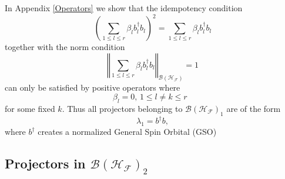 \documentclass[aps,preprint,amsfonts,amssymb,showpacs,showkeys]{revtex4}%
\begin{document}
In Appendix \ref{Operators} we show that the idempotency condition
\begin{equation}
\left(  \sum_{1\leq l\leq r}\beta_{l}b_{l}^{\dagger}b_{l}\right)  ^{2}%
=\sum_{1\leq l\leq r}\beta_{l}b_{l}^{\dagger}b_{l}%
\end{equation}
together with the norm condition
\begin{equation}
\left\Vert \sum_{1\leq l\leq r}\beta_{l}b_{l}^{\dagger}b_{l}\right\Vert
_{\mathcal{B}\left(  \mathcal{H}_{\mathcal{F}}\right)  }=1
\end{equation}
can only be satisfied by positive operators where
\begin{equation}
\beta_{l}=0,\,1\leq l\neq k\leq r\text{ }%
\end{equation}
for some fixed $k.$ Thus all projectors belonging to $\mathcal{B}\left(
\mathcal{H}_{\mathcal{F}}\right)  _{1}$ are of the form
\begin{equation}
\lambda_{1}=b^{\dagger}b,
\end{equation}
where $b^{\dagger}$ creates a normalized General Spin Orbital (GSO)

\subsection{Projectors in $\mathcal{B}\left(  \mathcal{H}_{\mathcal{F}%
}\right)  _{2}$ \label{Proj2}}
\end{document}
